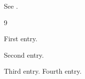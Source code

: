 \documentclass{article}
\begin{document}
See \cite{k}.
\begin{thebibliography}{9}
\item[{[A1]}] First entry.
\item [B2] Second entry.
\item Third entry.
 Fourth entry.
\end{thebibliography}
\end{document}
